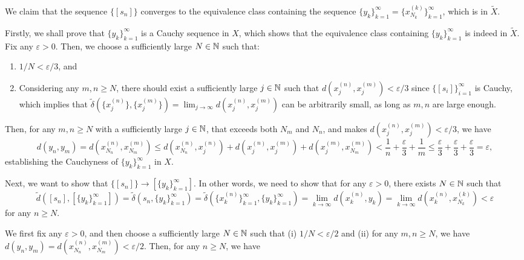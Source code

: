 \begin{enumerate}
We claim that the sequence \(\{[s_n]\}\) converges to the equivalence class
containing the sequence
\(\{y_k\}_{k=1}^{\infty}=\{x_{N_k}^{(k)}\}_{k=1}^{\infty}\), which is in \(\widetilde{X}\).

\begin{pf}
Firstly, we shall prove that \(\{y_k\}_{k=1}^{\infty}\) is a Cauchy sequence in
\(X\), which shows that the equivalence class containing
\(\{y_k\}_{k=1}^{\infty}\) is indeed in \(\widetilde{X}\).  Fix any
\(\varepsilon>0\). Then, we choose a sufficiently large \(N\in\mathbb{N}\) such that:
\begin{enumerate}
\item \(1/N<\varepsilon/3\), and
\item Considering any \(m,n\ge N\), there should exist a sufficiently large
\(j\in\mathbb{N}\) such that \(d(x_j^{(n)},x_j^{(m)})<\varepsilon/3\) since
\(\{[s_i]\}_{i=1}^{\infty}\) is Cauchy, which implies that
\(\widetilde{\delta}(\{x_j^{(n)}\},\{x_j^{(m)}\})=\lim_{j\to
\infty}d(x_j^{(n)},x_j^{(m)})\) can be arbitrarily small, as long as \(m,n\)
are large enough.
\end{enumerate}
Then, for any \(m,n\ge N\) with a sufficiently large \(j\in\mathbb{N}\), that exceeds
both \(N_m\) and \(N_n\), and makes \(d(x_j^{(n)},x_j^{(m)})<\varepsilon/3\),
we have
\[
d(y_n,y_m)=d(x_{N_n}^{(n)},x_{N_m}^{(m)})
\le
d(x_{N_n}^{(n)},x_j^{(n)})+d(x_j^{(n)},x_j^{(m)})+d(x_j^{(m)},x_{N_m}^{(m)})
<\frac{1}{n}+\frac{\varepsilon}{3}+\frac{1}{m}
\le\frac{\varepsilon}{3}+\frac{\varepsilon}{3}+\frac{\varepsilon}{3}
=\varepsilon,
\]
establishing the Cauchyness of \(\{y_k\}_{k=1}^{\infty}\) in \(X\).

Next, we want to show that \(\{[s_n]\}\to [\{y_k\}_{k=1}^{\infty}]\). In other
words, we need to show that for any \(\varepsilon>0\), there exists \(N\in\mathbb{N}\)
such that
\[
\widetilde{d}([s_n],[\{y_k\}_{k=1}^{\infty}])
=\widetilde{\delta}(s_n,\{y_k\}_{k=1}^{\infty})
=\widetilde{\delta}(\{x_k^{(n)}\}_{k=1}^{\infty},\{y_k\}_{k=1}^{\infty})
=\lim_{k\to \infty}d(x_k^{(n)},y_k)
=\lim_{k\to \infty}d(x_k^{(n)},x_{N_k}^{(k)})
<\varepsilon
\]
for any \(n\ge N\).

We first fix any \(\varepsilon>0\), and then choose a sufficiently large
\(N\in\mathbb{N}\) such that (i) \(1/N<\varepsilon/2\) and (ii) for any \(m,n\ge N\),
we have \(d(y_n,y_m)=d(x_{N_n}^{(n)},x_{N_m}^{(m)})<\varepsilon/2\). Then, for any
\(n\ge N\), we have


\end{pf}
\end{enumerate}
